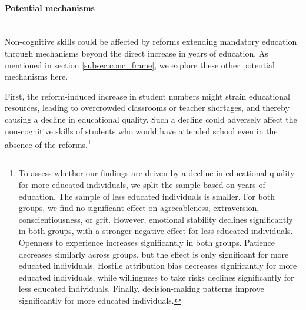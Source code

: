 \paragraph{Potential mechanisms} \label{sec:mechanisms} \mbox{}\\
Non-cognitive skills could be affected by reforms extending mandatory education through mechanisms beyond the direct increase in years of education. As mentioned in section \ref{subsec:conc_frame}, we explore these other potential mechanisms here.

First, the reform-induced increase in student numbers might strain educational resources, leading to overcrowded classrooms or teacher shortages, and thereby causing a decline in educational quality. Such a decline could adversely affect the non-cognitive skills of students who would have attended school even in the absence of the reforms.\footnote{
	To assess whether  our findings are driven by a decline in educational quality for more educated individuals, we split the sample based on years of education. The sample of less educated individuals is smaller. For both groups, we find no significant effect on agreeableness, extraversion, conscientiousness, or grit. However, emotional stability declines significantly in both groups, with a stronger negative effect for less educated individuals. Openness to experience increases significantly in both groups. Patience decreases similarly across groups, but the effect is only significant for more educated individuals. Hostile attribution bias decreases significantly for more educated individuals, while willingness to take risks declines significantly for less educated individuals. Finally, decision-making patterns improve significantly for more educated individuals.
}
